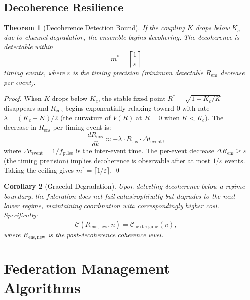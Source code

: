 \documentclass[twocolumn,10pt]{article}
\newtheorem{theorem}{Theorem}[section]
\newtheorem{corollary}[theorem]{Corollary}
\newcommand{\Rens}{R_{\mathrm{ens}}}
\newcommand{\Kc}{K_c}
\begin{document}
\subsection{Decoherence Resilience}

\begin{theorem}[Decoherence Detection Bound]
\label{thm:decoherence}
If the coupling $K$ drops below $\Kc$ due to channel degradation, the ensemble
begins decohering. The decoherence is detectable within
\begin{equation}
\label{eq:detect_bound}
  m^* = \left\lceil \frac{1}{\varepsilon} \right\rceil
\end{equation}
timing events, where $\varepsilon$ is the timing precision (minimum detectable
$\Rens$ decrease per event).
\end{theorem}

\begin{proof}
When $K$ drops below $\Kc$, the stable fixed point $R^* = \sqrt{1-\Kc/K}$
disappears and $\Rens$ begins exponentially relaxing toward 0 with rate
$\lambda = (\Kc - K)/2$ (the curvature of $V(R)$ at $R = 0$ when
$K < \Kc$). The decrease in $\Rens$ per timing event is:
\[
  \frac{d\Rens}{dk} \approx -\lambda \cdot \Rens \cdot \Delta t_{\mathrm{event}},
\]
where $\Delta t_{\mathrm{event}} = 1/f_{\mathrm{pulse}}$ is the inter-event
time. The per-event decrease $\Delta\Rens \geq \varepsilon$ (the timing
precision) implies decoherence is observable after at most $1/\varepsilon$
events. Taking the ceiling gives $m^* = \lceil 1/\varepsilon \rceil$. \qed
\end{proof}

\begin{corollary}[Graceful Degradation]
\label{cor:degrade}
Upon detecting decoherence below a regime boundary, the federation does not
fail catastrophically but degrades to the next lower regime, maintaining
coordination with correspondingly higher cost. Specifically:
\[
  \mathcal{C}(R_{\mathrm{ens,new}}, n) = \mathcal{C}_{\mathrm{next\,regime}}(n),
\]
where $R_{\mathrm{ens,new}}$ is the post-decoherence coherence level.
\end{corollary}

\section{Federation Management Algorithms}
\label{sec:algorithms}
\end{document}
